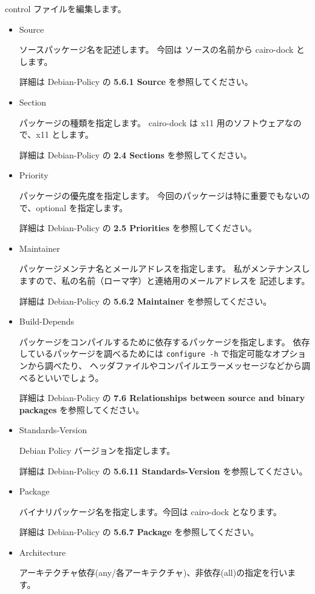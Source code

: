 \documentclass[mingoth,a4paper]{jsarticle}
\begin{document}
\begin{enumerate}
		control ファイルを編集します。
	\begin{itemize}
		\item Source	

			ソースパッケージ名を記述します。
			今回は ソースの名前から cairo-dock とします。

			詳細は Debian-Policy の {\bf 5.6.1 Source} を参照してください。
		\item Section

			パッケージの種類を指定します。
			cairo-dock は x11 用のソフトウェアなので、x11 とします。

			詳細は Debian-Policy の {\bf 2.4 Sections} を参照してください。
		\item Priority
	
			パッケージの優先度を指定します。
			今回のパッケージは特に重要でもないので、optional を指定します。

			詳細は Debian-Policy の {\bf 2.5 Priorities} を参照してください。

		\item Maintainer

			パッケージメンテナ名とメールアドレスを指定します。
			私がメンテナンスしますので、私の名前（ローマ字）と連絡用のメールアドレスを
			記述します。

			詳細は Debian-Policy の {\bf 5.6.2 Maintainer} を参照してください。
			
		\item Build-Depends
			
			パッケージをコンパイルするために依存するパッケージを指定します。
			依存しているパッケージを調べるためには \texttt{configure -h} で指定可能なオプションから調べたり、
			ヘッダファイルやコンパイルエラーメッセージなどから調べるといいでしょう。

			詳細は Debian-Policy の {\bf 7.6 Relationships between source and binary packages} を参照してください。
		\item Standards-Version

			Debian Policy バージョンを指定します。

			詳細は Debian-Policy の {\bf 5.6.11 Standards-Version} を参照してください。
		\item Package

			バイナリパッケージ名を指定します。今回は cairo-dock となります。

			詳細は Debian-Policy の {\bf 5.6.7 Package} を参照してください。
		\item Architecture

			アーキテクチャ依存(any/各アーキテクチャ)、非依存(all)の指定を行います。


\end{itemize}
\end{enumerate}
\end{document}
